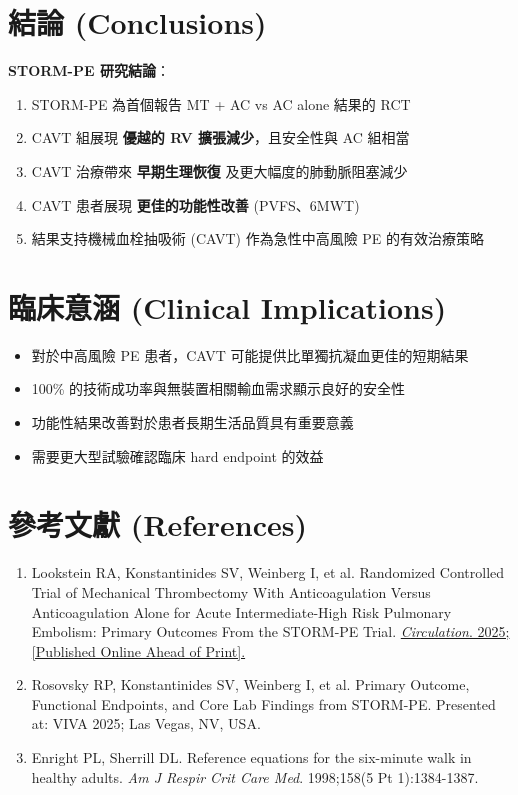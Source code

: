 \documentclass[11pt,a4paper]{article}
\begin{document}
\section{結論 (Conclusions)}

\begin{importantbox}
\textbf{STORM-PE 研究結論}：
\begin{enumerate}[leftmargin=*,itemsep=2pt]
    \item STORM-PE 為首個報告 MT + AC vs AC alone 結果的 RCT
    \item CAVT 組展現 \textbf{優越的 RV 擴張減少}，且安全性與 AC 組相當
    \item CAVT 治療帶來 \textbf{早期生理恢復} 及更大幅度的肺動脈阻塞減少
    \item CAVT 患者展現 \textbf{更佳的功能性改善} (PVFS、6MWT)
    \item 結果支持機械血栓抽吸術 (CAVT) 作為急性中高風險 PE 的有效治療策略
\end{enumerate}
\end{importantbox}

\section{臨床意涵 (Clinical Implications)}

\begin{itemize}[leftmargin=*,itemsep=2pt]
    \item 對於中高風險 PE 患者，CAVT 可能提供比單獨抗凝血更佳的短期結果
    \item 100\% 的技術成功率與無裝置相關輸血需求顯示良好的安全性
    \item 功能性結果改善對於患者長期生活品質具有重要意義
    \item 需要更大型試驗確認臨床 hard endpoint 的效益
\end{itemize}

\section{參考文獻 (References)}

\begin{enumerate}[leftmargin=*,itemsep=3pt]
    \item Lookstein RA, Konstantinides SV, Weinberg I, et al. Randomized Controlled Trial of Mechanical Thrombectomy With Anticoagulation Versus Anticoagulation Alone for Acute Intermediate-High Risk Pulmonary Embolism: Primary Outcomes From the STORM-PE Trial. \href{https://doi.org/10.1161/CIRCULATIONAHA.125.077232}{\textit{Circulation}. 2025; [Published Online Ahead of Print].}
    \item Rosovsky RP, Konstantinides SV, Weinberg I, et al. Primary Outcome, Functional Endpoints, and Core Lab Findings from STORM-PE. Presented at: VIVA 2025; Las Vegas, NV, USA.
    \item Enright PL, Sherrill DL. Reference equations for the six-minute walk in healthy adults. \textit{Am J Respir Crit Care Med}. 1998;158(5 Pt 1):1384-1387.
\end{enumerate}
\end{document}

